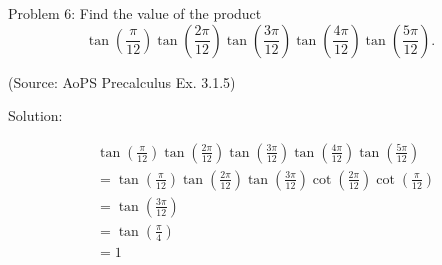 Problem 6: Find the value of the product\[ \tan\left(\dfrac{\pi}{12}\right)\tan\left(\dfrac{2\pi}{12}\right)\tan\left(\dfrac{3\pi}{12}\right)\tan\left(\dfrac{4\pi}{12}\right)\tan\left(\dfrac{5\pi}{12}\right). \]

(Source: AoPS Precalculus Ex. 3.1.5)

Solution:

\begin{align*}
& \tan \left( \frac{\pi}{12} \right) \tan \left( \frac{2\pi}{12} \right) \tan \left( \frac{3\pi}{12} \right) \tan \left( \frac{4\pi}{12} \right) \tan \left( \frac{5\pi}{12} \right) \\
&= \tan \left( \frac{\pi}{12} \right) \tan \left( \frac{2\pi}{12} \right) \tan \left( \frac{3\pi}{12} \right) \cot \left( \frac{2\pi}{12} \right) \cot \left( \frac{\pi}{12} \right) \\
&= \tan \left( \frac{3\pi}{12} \right) \\
&= \tan \left( \frac{\pi}{4} \right) \\
&= \boxed{1}
\end{align*}
